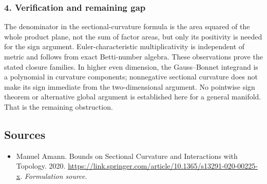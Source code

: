 \documentclass[11pt]{article}
\begin{document}
\subsubsection{4. Verification and remaining gap}
The denominator in the sectional-curvature formula is the area squared of the whole product plane, not the sum of factor areas, but only its positivity is needed for the sign argument. Euler-characteristic multiplicativity is independent of metric and follows from exact Betti-number algebra. These observations prove the stated closure families. In higher even dimension, the Gauss--Bonnet integrand is a polynomial in curvature components; nonnegative sectional curvature does not make its sign immediate from the two-dimensional argument. No pointwise sign theorem or alternative global argument is established here for a general manifold. That is the remaining obstruction.

\subsection{Sources}
\begin{itemize}
\item[S1]Manuel Amann. Bounds on Sectional Curvature and Interactions with Topology. 2020.
\url{https://link.springer.com/article/10.1365/s13291-020-00225-x}.
\textit{Formulation source.}
\end{itemize}
\end{document}
